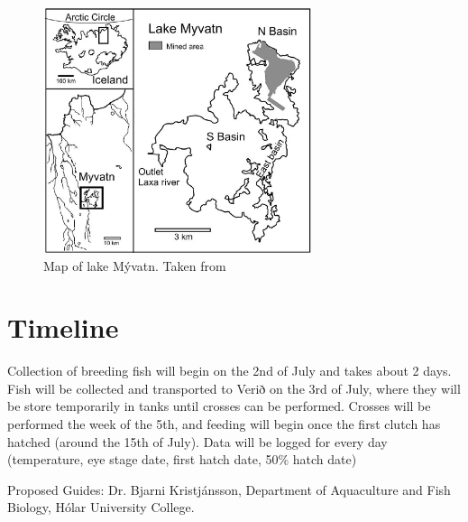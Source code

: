 \documentclass[12pt]{extarticle}
\begin{document}
\begin{figure}
\centering
 \includegraphics[width=0.7\textwidth]{lake}
 \caption{Map of lake M\'yvatn. Taken from \citet{Einarsson2004}}
  \label{fig:pedigree1}
\end{figure}

\section{Timeline}
Collection of breeding fish will begin on the 2nd of July and takes about 2 days. Fish will be collected and transported to Verið on the 3rd of July, where they will be store temporarily in tanks until crosses can be performed. Crosses will be performed the week of the 5th, and feeding will begin once the first clutch has hatched (around the 15th of July). Data will be logged for every day (temperature, eye stage date, first hatch date, 50\% hatch date)

Proposed Guides: Dr. Bjarni Kristj\'ansson, Department of Aquaculture and Fish Biology, H\'olar University College.

\end{document}
